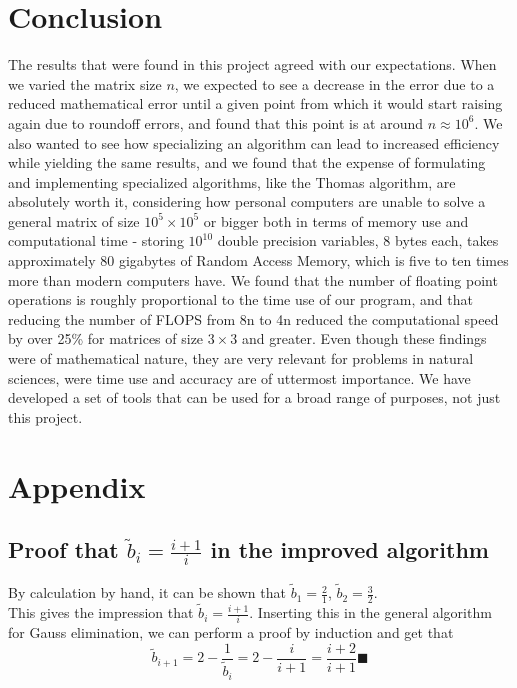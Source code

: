 \documentclass[10pt,a4paper]{article}
\begin{document}
\section{Conclusion}
The results that were found in this project agreed with our expectations. When we varied the matrix size $n$, we expected to see a decrease in the error due to a reduced mathematical error until a given point from which it would start raising again due to roundoff errors, and found that this point is at around $n \approx 10^6$. We also wanted to see how specializing an algorithm can lead to increased efficiency while yielding the same results, and we found that the expense of formulating and implementing specialized algorithms, like the Thomas algorithm, are absolutely worth it, considering how personal computers are unable to solve a general matrix of size $10^5\times10^5$ or bigger both in terms of memory use and computational time - storing $10^{10}
$ double precision variables, 8 bytes each, takes approximately 80 gigabytes of Random Access Memory, which is five to ten times more than modern computers have. We found that the number of floating point operations is roughly proportional to the time use of our program, and that reducing the number of FLOPS from 8n to 4n reduced the computational speed by over 25\% for matrices of size $3\times 3$ and greater. Even though these findings were of mathematical nature, they are very relevant for problems in natural sciences, were time use and accuracy are of uttermost importance. We have developed a set of tools that can be used for a broad range of purposes, not just this project.
\section{Appendix}
\subsection{Proof that $\tilde{b}_i=\frac{i+1}{i}$ in the improved algorithm}
By calculation by hand, it can be shown that  $\tilde{b}_1=\frac{2}{1}$,  $\tilde{b}_2=\frac{3}{2}$.\\
This gives the impression that  $\tilde{b}_i=\frac{i+1}{i}$.
Inserting this in the general algorithm for Gauss elimination, we can perform a proof by induction and get that
 $$\tilde{b}_{i+1}=2-\frac{1}{\tilde{b}_{i}}=2-\frac{i}{i+1}=\frac{i+2}{i+1} \blacksquare$$
\end{document}
